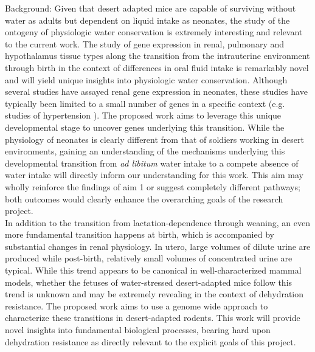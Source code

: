 \documentclass[12pt]{article}
\begin{document}
Background: Given that desert adapted mice are capable of surviving without water as adults but dependent on liquid intake as neonates, {the study of the ontogeny of physiologic water conservation is extremely interesting and relevant to the current work.} The study of gene expression in renal, pulmonary and hypothalamus tissue types along the transition from the intrauterine environment through birth in the context of differences in oral fluid intake is remarkably novel and will yield unique insights into physiologic water conservation. Although several studies have assayed renal gene expression in neonates, these studies have typically been limited to a small number of genes in a specific context (e.g. studies of hypertension \citep{Sampson:2012hb,Shanmugam:1996ed}). The proposed work aims to leverage this unique developmental stage to uncover genes underlying this transition. While the physiology of neonates is clearly different from that of soldiers working in desert environments, gaining an understanding of the mechanisms underlying this developmental transition from \textit{ad libitum} water intake to a compete absence of water intake will directly inform our understanding for this work. This aim may wholly reinforce the findings of aim 1 or suggest completely different pathways; both outcomes would clearly enhance the overarching goals of the research project. \\

In addition to the transition from lactation-dependence through weaning, an even more fundamental transition happens at birth, which is accompanied by substantial changes in renal physiology. In utero, large volumes of dilute urine are produced \citep{Wintour:1997ts} while post-birth, relatively small volumes of concentrated urine are typical. While this trend appears to be canonical in well-characterized mammal models, whether the fetuses of water-stressed desert-adapted mice follow this trend is unknown and may be extremely revealing in the context of dehydration resistance. The proposed work aims to use a genome wide approach to characterize these transitions in desert-adapted rodents. This work will provide novel insights into fundamental biological processes, bearing hard upon dehydration resistance as directly relevant to the explicit goals of this project.   \\  
\end{document}
